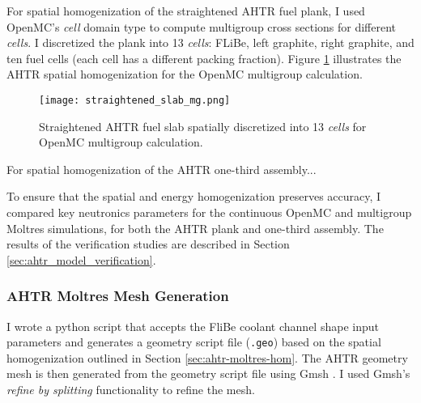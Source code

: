 For spatial homogenization of the straightened \gls{AHTR} fuel plank, I used 
OpenMC's \textit{cell} domain type to compute multigroup cross sections for 
different \textit{cells}. 
I discretized the plank into 13 \textit{cells}: FLiBe, left graphite, right 
graphite, and ten fuel cells (each cell has a different packing fraction).
Figure \ref{fig:straightened_slab_mg} illustrates the \gls{AHTR} spatial 
homogenization for the OpenMC multigroup calculation. 
\begin{figure}[]
    \centering
    \texttt{[image: straightened\_slab\_mg.png]}
    \raggedright
    \caption{Straightened \acrfull{AHTR} fuel slab spatially discretized into 
    13 \textit{cells} for OpenMC multigroup calculation.}
    \label{fig:straightened_slab_mg}
\end{figure}

For spatial homogenization of the \gls{AHTR} one-third assembly... 

To ensure that the spatial and energy homogenization preserves accuracy, I 
compared key neutronics parameters for the continuous OpenMC and multigroup 
Moltres simulations, for both the \gls{AHTR} plank and one-third assembly.
The results of the verification studies are described in Section 
\ref{sec:ahtr_model_verification}.

\subsubsection{AHTR Moltres Mesh Generation}
I wrote a python script that accepts the FliBe coolant channel shape input 
parameters and generates a geometry script file (\texttt{.geo}) based on the 
spatial homogenization outlined in Section \ref{sec:ahtr-moltres-hom}.
The AHTR geometry mesh is then generated from the geometry script file using 
Gmsh \cite{geuzaine_gmsh_2009}.
I used Gmsh's \textit{refine by splitting} functionality to refine the mesh. 

